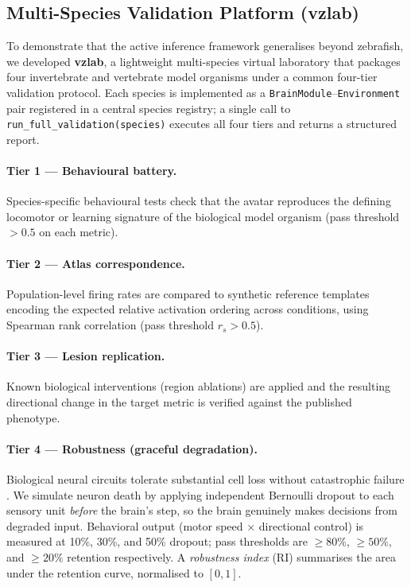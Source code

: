 \documentclass[12pt]{article}
\begin{document}
\subsection{Multi-Species Validation Platform (vzlab)}\label{sec:vzlab}

To demonstrate that the active inference framework generalises beyond
zebrafish, we developed \textbf{vzlab}, a lightweight multi-species
virtual laboratory that packages four invertebrate and vertebrate model
organisms under a common four-tier validation protocol.
Each species is implemented as a \texttt{BrainModule}--\texttt{Environment}
pair registered in a central species registry; a single call to
\texttt{run\_full\_validation(species)} executes all four tiers
and returns a structured report.

\paragraph{Tier 1 --- Behavioural battery.}
Species-specific behavioural tests check that the avatar reproduces
the defining locomotor or learning signature of the biological model
organism (pass threshold $>0.5$ on each metric).

\paragraph{Tier 2 --- Atlas correspondence.}
Population-level firing rates are compared to synthetic reference
templates encoding the expected relative activation ordering across
conditions, using Spearman rank correlation (pass threshold $r_s > 0.5$).

\paragraph{Tier 3 --- Lesion replication.}
Known biological interventions (region ablations) are applied
and the resulting directional change in the target metric is verified
against the published phenotype.

\paragraph{Tier 4 --- Robustness (graceful degradation).}
Biological neural circuits tolerate substantial cell loss without
catastrophic failure \citep{rakic2002}.
We simulate neuron death by applying independent Bernoulli dropout
to each sensory unit \emph{before} the brain's step, so the brain
genuinely makes decisions from degraded input.
Behavioral output (motor speed $\times$ directional control) is measured
at 10\%, 30\%, and 50\% dropout; pass thresholds are ${\ge}80\%$,
${\ge}50\%$, and ${\ge}20\%$ retention respectively.
A \emph{robustness index} (RI) summarises the area under the
retention curve, normalised to $[0,1]$.
\end{document}
